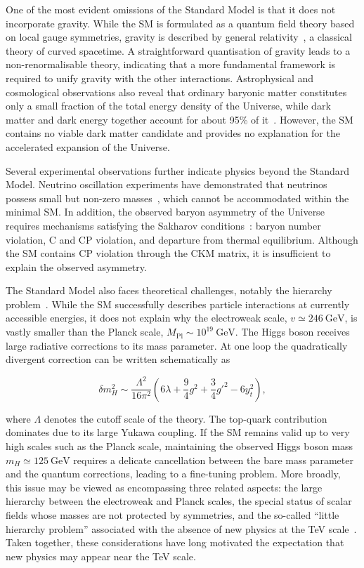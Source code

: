 One of the most evident omissions of the Standard Model is that it
does not incorporate gravity. While the SM is formulated as a quantum
field theory based on local gauge symmetries, gravity is described by
general relativity~\cite{Einstein1916GR}, a classical theory of curved
spacetime. A straightforward quantisation of gravity leads to a
non-renormalisable theory, indicating that a more fundamental
framework is required to unify gravity with the other interactions.
Astrophysical and cosmological observations also reveal that ordinary
baryonic matter constitutes only a small fraction of the total energy
density of the Universe, while dark matter and dark energy together
account for about 95\% of it~\cite{Begeman1991RotationCurves,PlanckXVI2014CosmologicalParameters}.
However, the SM contains no viable dark matter candidate and provides
no explanation for the accelerated expansion of the Universe.

Several experimental observations further indicate physics beyond the
Standard Model. Neutrino oscillation experiments have demonstrated
that neutrinos possess small but non-zero masses~\cite{Fukuda1998NeutrinoOscillation},
which cannot be accommodated within the minimal SM. In addition,
the observed baryon asymmetry of the Universe requires mechanisms
satisfying the Sakharov conditions~\cite{Sakharov:1967dj}: baryon
number violation, C and CP violation, and departure from thermal
equilibrium. Although the SM contains CP violation through the CKM
matrix, it is insufficient to explain the observed asymmetry.

The Standard Model also faces theoretical challenges, notably the
hierarchy problem~\cite{Veltman1981,PeskinHierarchy}. While the SM
successfully describes particle interactions at currently accessible
energies, it does not explain why the electroweak scale,
$v \simeq 246~\mathrm{GeV}$, is vastly smaller than the Planck scale,
$M_{\mathrm{Pl}} \sim 10^{19}~\mathrm{GeV}$. The Higgs boson receives
large radiative corrections to its mass parameter. At one loop the
quadratically divergent correction can be written schematically as

\begin{equation}
\delta m_H^2 \sim
\frac{\Lambda^2}{16\pi^2}
\left(
6\lambda + \frac{9}{4}g^2 + \frac{3}{4}g'^2 - 6y_t^2
\right),
\end{equation}

where $\Lambda$ denotes the cutoff scale of the theory. The
top-quark contribution dominates due to its large Yukawa coupling.
If the SM remains valid up to very high scales such as the Planck
scale, maintaining the observed Higgs boson mass
$m_H \simeq 125~\mathrm{GeV}$ requires a delicate cancellation between
the bare mass parameter and the quantum corrections, leading to a
fine-tuning problem. More broadly, this issue may be viewed as
encompassing three related aspects: the large hierarchy between the
electroweak and Planck scales, the special status of scalar fields
whose masses are not protected by symmetries, and the so-called
``little hierarchy problem'' associated with the absence of new
physics at the TeV scale~\cite{PeskinHierarchy}. Taken together,
these considerations have long motivated the expectation that new
physics may appear near the TeV scale.

